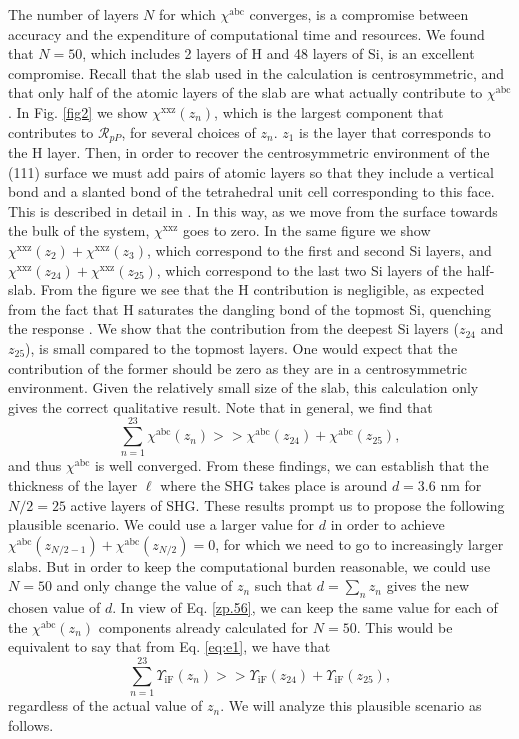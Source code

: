 \documentclass[utf8]{frontiersSCNS}
\begin{document}
The number of layers $N$ for which $\chi^{\mathrm{abc}}$ converges, is a
compromise between accuracy and the expenditure of computational time and
resources. We found that $N = 50$, which includes 2 layers of H and 48 layers of
Si, is an excellent compromise. Recall that the slab used in the calculation is
centrosymmetric, and that only half of the atomic layers of the slab are what
actually contribute to $\chi^{\mathrm{abc}}$. In Fig. \ref{fig2} we show
$\chi^{\mathrm{xxz}}(z_{n})$, which is the largest component that contributes to
$\mathcal{R}_{pP}$, for several choices of $z_{n}$. $z_{1}$ is the layer that
corresponds to the H layer. Then, in order to recover the centrosymmetric
environment of the (111) surface we must add pairs of atomic layers so that they
include a vertical bond and a slanted bond of the tetrahedral unit cell
corresponding to this face. This is described in detail in \cite{mejiaRMF04}. In
this way, as we move from the surface towards the bulk of the system,
$\chi^{\mathrm{xxz}}$ goes to zero. In the same figure we show
$\chi^{\mathrm{xxz}}(z_{2})+\chi^{\mathrm{xxz}}(z_{3})$, which correspond to the
first and second Si layers, and
$\chi^{\mathrm{xxz}}(z_{24})+\chi^{\mathrm{xxz}}(z_{25})$, which correspond to
the last two Si layers of the half-slab. From the figure we see that the H
contribution is negligible, as expected from the fact that H saturates the
dangling bond of the topmost Si, quenching the response \citep{mejiaPRB02}. We
show that the contribution from the deepest Si layers ($z_{24}$ and $z_{25}$),
is small compared to the topmost layers. One would expect that the contribution
of the former should be zero as they are in a centrosymmetric environment. Given
the relatively small size of the slab, this calculation only gives the correct
qualitative result. Note that in general, we find that
\begin{equation}\label{zp.56}
\sum_{n=1}^{23}\chi^{\mathrm{abc}}(z_{n}) 
>>\chi^{\mathrm{abc}}(z_{24})+\chi^{\mathrm{abc}}(z_{25}),
\end{equation} 
and thus $\chi^{\mathrm{abc}}$ is well converged. From these findings, we can
establish that the thickness of the layer $\ell$ where the SHG takes place is
around $d = 3.6$ nm for $N/2 = 25$ active layers of SHG. These results prompt us
to propose the following plausible scenario. We could use a larger value for $d$
in order to achieve $\chi^{\mathrm{abc}}(z_{N/2-1}) +
\chi^{\mathrm{abc}}(z_{N/2}) = 0$, for which we need to go to increasingly
larger slabs. But in order to keep the computational burden reasonable, we could
use $N = 50$ and only change the value of $z_{n}$ such that $d = \sum_{n} z_{n}$
gives the new chosen value of $d$. In view of Eq. \eqref{zp.56}, we can keep the
same value for each of the $\chi^{\mathrm{abc}}(z_{n})$ components already
calculated for $N = 50$. This would be equivalent to say that from Eq.
\eqref{eq:e1}, we have that
\begin{equation}\label{zp.57}
\sum_{n=1}^{23}\Upsilon_{\mathrm{iF}}(z_{n}) 
>>\Upsilon_{\mathrm{iF}}(z_{24}) +\Upsilon_{\mathrm{iF}}(z_{25}),
\end{equation}  
regardless of the actual value of $z_{n}$. We will analyze this plausible
scenario as follows.
\end{document}
